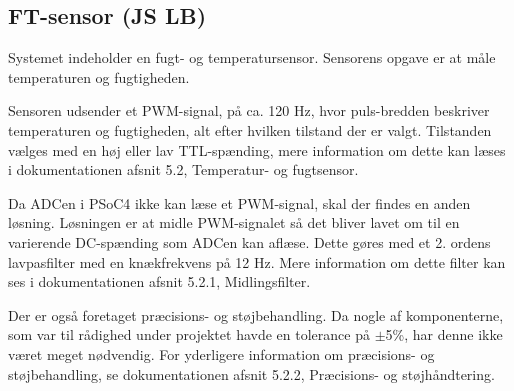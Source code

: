 \subsection{FT-sensor (JS LB)}


Systemet indeholder en fugt- og temperatursensor. Sensorens opgave er at måle temperaturen og fugtigheden.

Sensoren udsender et PWM-signal, på ca. 120 Hz, hvor puls-bredden beskriver temperaturen og fugtigheden, alt efter hvilken tilstand der er valgt. Tilstanden vælges med en høj eller lav TTL-spænding, mere information om dette kan læses i dokumentationen afsnit 5.2, Temperatur- og fugtsensor.

Da ADCen i PSoC4 ikke kan læse et PWM-signal, skal der findes en anden løsning. Løsningen er at midle PWM-signalet så det bliver lavet om til en varierende DC-spænding som ADCen kan aflæse. Dette gøres med et 2. ordens lavpasfilter med en knækfrekvens på 12 Hz. Mere information om dette filter kan ses i dokumentationen afsnit 5.2.1, Midlingsfilter.
 
Der er også foretaget præcisions- og støjbehandling. Da nogle af komponenterne, som var til rådighed under projektet havde en tolerance på $\pm$5\%, har denne ikke været meget nødvendig. For yderligere information om præcisions- og støjbehandling, se dokumentationen afsnit 5.2.2, Præcisions- og støjhåndtering. 